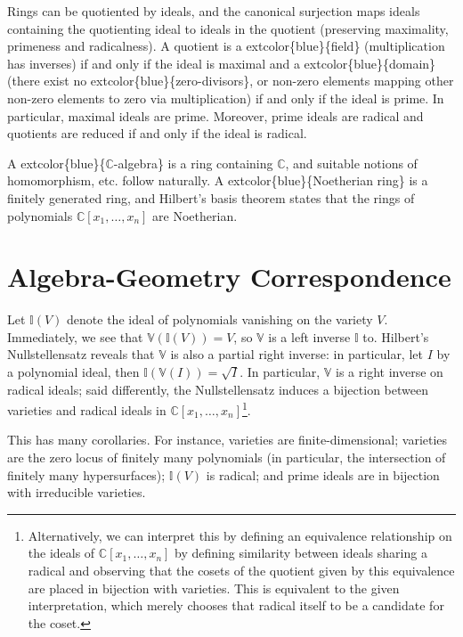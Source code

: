 \documentclass[
]{book}
\begin{document}
Rings can be quotiented by ideals, and the canonical surjection maps ideals containing the quotienting ideal to ideals in the quotient (preserving maximality, primeness and radicalness). A quotient is a extcolor\{blue\}\{field\} (multiplication has inverses) if and only if the ideal is maximal and a extcolor\{blue\}\{domain\} (there exist no extcolor\{blue\}\{zero-divisors\}, or non-zero elements mapping other non-zero elements to zero via multiplication) if and only if the ideal is prime. In particular, maximal ideals are prime. Moreover, prime ideals are radical and quotients are reduced if and only if the ideal is radical.

A extcolor\{blue\}\{\(\mathbb{C}\)-algebra\} is a ring containing \(\mathbb{C}\), and suitable notions of homomorphism, etc. follow naturally. A extcolor\{blue\}\{Noetherian ring\} is a finitely generated ring, and Hilbert's basis theorem states that the rings of polynomials \(\mathbb{C}[x_1, \dots, x_n]\) are Noetherian.

\hypertarget{algebra-geometry-correspondence}{%
\section{Algebra-Geometry Correspondence}\label{algebra-geometry-correspondence}}

Let \(\mathbb{I}(V)\) denote the ideal of polynomials vanishing on the variety \(V\). Immediately, we see that \(\mathbb{V}(\mathbb{I}(V)) = V\), so \(\mathbb{V}\) is a left inverse \(\mathbb{I}\) to. Hilbert's Nullstellensatz reveals that \(\mathbb{V}\) is also a partial right inverse: in particular, let \(I\) by a polynomial ideal, then \(\mathbb{I}(\mathbb{V}(I)) = \sqrt{I}\). In particular, \(\mathbb{V}\) is a right inverse on radical ideals; said differently, the Nullstellensatz induces a bijection between varieties and radical ideals in \(\mathbb{C}[x_1, \dots, x_n]\)\footnote{Alternatively, we can interpret this by defining an equivalence relationship on the ideals of \(\mathbb{C}[x_1, \dots, x_n]\) by defining similarity between ideals sharing a radical and observing that the cosets of the quotient given by this equivalence are placed in bijection with varieties. This is equivalent to the given interpretation, which merely chooses that radical itself to be a candidate for the coset.}.

This has many corollaries. For instance, varieties are finite-dimensional; varieties are the zero locus of finitely many polynomials (in particular, the intersection of finitely many hypersurfaces); \(\mathbb{I}(V)\) is radical; and prime ideals are in bijection with irreducible varieties.
\end{document}
